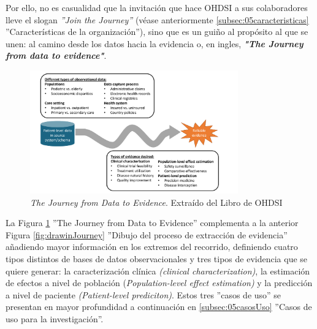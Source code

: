 Por ello, no es casualidad que la invitación que hace OHDSI a sus colaboradores lleve el slogan \textit{''Join the Journey''} (véase anteriormente \ref{subsec:05caracteristicas} ''Características de la organización''), sino que es un guiño al propósito al que se unen: al camino desde los datos hacia la evidencia o, en ingles, \textit{\textbf{"The Journey from data to evidence"}}.  



\begin{figure}[H]
    \centering
    \includegraphics[width=0.80\textwidth]{figures/journeyDataToEvidence.png}
     \caption{\textit{The Journey from Data to Evidence}. Extraído del Libro de OHDSI \cite{OHDSIbook}}
    \label{fig:journeyDataToEvidence}
\end{figure}

La Figura \ref{fig:journeyDataToEvidence} ''The Journey from Data to Evidence'' complementa a la anterior Figura \ref{fig:drawinJourney} ''Dibujo del proceso de extracción de evidencia'' añadiendo mayor información en los extremos del recorrido, definiendo cuatro tipos distintos de bases de datos observacionales y tres tipos de evidencia que se quiere generar: la caracterización clínica \textit{(clinical characterization)}, la estimación de efectos a nivel de población (\textit{Population-level effect estimation)} y la predicción a nivel de paciente \textit{(Patient-level prediciton)}. Estos tres ''casos de uso'' se presentan en mayor profundidad a continuación en  \ref{subsec:05casosUso} ''Casos de uso para la investigación''.

